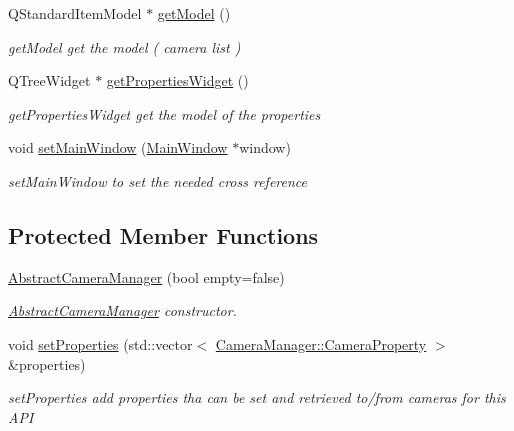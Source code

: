 \begin{DoxyCompactItemize}
\item 
Q\-Standard\-Item\-Model $\ast$ \hyperlink{class_abstract_camera_manager_a02097102061955f0092969a6cf812823}{get\-Model} ()
\begin{DoxyCompactList}\small\item\em get\-Model get the model ( camera list ) \end{DoxyCompactList}\item 
Q\-Tree\-Widget $\ast$ \hyperlink{class_abstract_camera_manager_a8cfcc9f2156936f1d8faea55ad97eeab}{get\-Properties\-Widget} ()
\begin{DoxyCompactList}\small\item\em get\-Properties\-Widget get the model of the properties \end{DoxyCompactList}\item 
void \hyperlink{class_abstract_camera_manager_a9369df77518a91e24596d2bbe3436bab}{set\-Main\-Window} (\hyperlink{class_main_window}{Main\-Window} $\ast$window)
\begin{DoxyCompactList}\small\item\em set\-Main\-Window to set the needed cross reference \end{DoxyCompactList}\end{DoxyCompactItemize}
\subsection*{Protected Member Functions}
\begin{DoxyCompactItemize}
\item 
\hyperlink{class_abstract_camera_manager_a23be9d93959d992c91efcf1416c597ef}{Abstract\-Camera\-Manager} (bool empty=false)
\begin{DoxyCompactList}\small\item\em \hyperlink{class_abstract_camera_manager}{Abstract\-Camera\-Manager} constructor. \end{DoxyCompactList}\item 
void \hyperlink{class_abstract_camera_manager_ac5c7ff3b69138df82efafa0400b50ce5}{set\-Properties} (std\-::vector$<$ \hyperlink{class_camera_manager_1_1_camera_property}{Camera\-Manager\-::\-Camera\-Property} $>$ \&properties)
\begin{DoxyCompactList}\small\item\em set\-Properties add properties tha can be set and retrieved to/from cameras for this A\-P\-I \end{DoxyCompactList}\end{DoxyCompactItemize}


